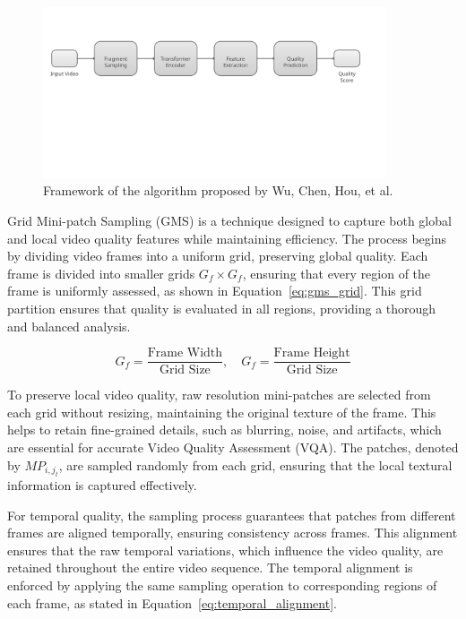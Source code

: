 \begin{figure}
    \centering
    \includegraphics[width=0.9\textwidth]{figures/fast-vqa-framework-3.png}
    \caption{Framework of the algorithm proposed by Wu, Chen, Hou, et al.~\cite{wu2022fastvqa}}
    \label{fig:framework1}
\end{figure}

Grid Mini-patch Sampling (GMS) is a technique designed to capture both global and local video quality features while maintaining efficiency. The process begins by dividing video frames into a uniform grid, preserving global quality. Each frame is divided into smaller grids \(G_f \times G_f\), ensuring that every region of the frame is uniformly assessed, as shown in Equation~\ref{eq:gms_grid}. This grid partition ensures that quality is evaluated in all regions, providing a thorough and balanced analysis.

\begin{equation}
G_f = \frac{\text{Frame Width}}{\text{Grid Size}}, \quad G_f = \frac{\text{Frame Height}}{\text{Grid Size}}
\label{eq:gms_grid}
\end{equation}

To preserve local video quality, raw resolution mini-patches are selected from each grid without resizing, maintaining the original texture of the frame. This helps to retain fine-grained details, such as blurring, noise, and artifacts, which are essential for accurate Video Quality Assessment (VQA). The patches, denoted by $MP_{i,j_t}$, are sampled randomly from each grid, ensuring that the local textural information is captured effectively.

For temporal quality, the sampling process guarantees that patches from different frames are aligned temporally, ensuring consistency across frames. This alignment ensures that the raw temporal variations, which influence the video quality, are retained throughout the entire video sequence. The temporal alignment is enforced by applying the same sampling operation to corresponding regions of each frame, as stated in Equation~\ref{eq:temporal_alignment}.

